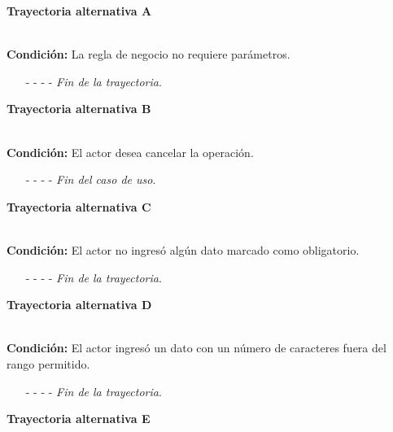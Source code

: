 \hypertarget{CU8-2:TAA}{\textbf{Trayectoria alternativa A}}\\
\noindent \textbf{Condición:} La regla de negocio no requiere parámetros.
\begin{enumerate}
	\UCpaso[\UCactor] Continúa con el paso \ref{CU8.2-P11} de la trayectoria principal.
	\item[- -] - - {\em {Fin de la trayectoria}}.%
\end{enumerate}

\hypertarget{CU8-2:TAB}{\textbf{Trayectoria alternativa B}}\\
\noindent \textbf{Condición:} El actor desea cancelar la operación.
\begin{enumerate}
	\UCpaso[\UCactor] Solicita cancelar la operación oprimiendo el botón  de la pantalla 
	\UCpaso[\UCsist] Muestra la pantalla .
	\item[- -] - - {\em {Fin del caso de uso}}.%
\end{enumerate}
\hypertarget{CU8-2:TAC}{\textbf{Trayectoria alternativa C}}\\
\noindent \textbf{Condición:} El actor no ingresó algún dato marcado como obligatorio.
\begin{enumerate}
	\UCpaso[\UCsist] Muestra el mensaje  señalando el campo que presenta el error en la pantalla .
	\UCpaso Regresa al paso \ref{CU8.2-P5} de la trayectoria principal.
	\item[- -] - - {\em {Fin de la trayectoria}}.%
\end{enumerate}
\hypertarget{CU8-2:TAD}{\textbf{Trayectoria alternativa D}}\\
\noindent \textbf{Condición:} El actor ingresó un dato con un número de caracteres fuera del rango permitido.
\begin{enumerate}
	\UCpaso[\UCsist] Muestra el mensaje  señalando el campo que presenta el error en la pantalla .
	\UCpaso Regresa al paso \ref{CU8.2-P5} de la trayectoria principal.
	\item[- -] - - {\em {Fin de la trayectoria}}.%
\end{enumerate}
\hypertarget{CU8-2:TAE}{\textbf{Trayectoria alternativa E}}\\
